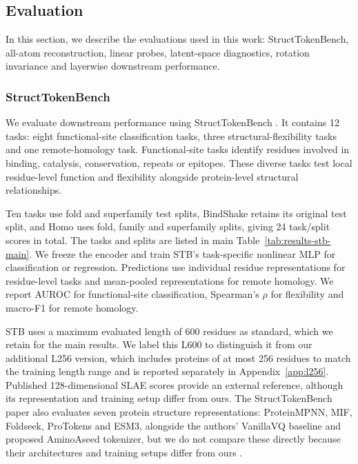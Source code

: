 \subsection{Evaluation}
\label{sec:methods-evaluation}

In this section, we describe the evaluations used in this work: StructTokenBench, all-atom reconstruction, linear probes, latent-space diagnostics, rotation invariance and layerwise downstream performance.


\subsubsection{StructTokenBench}

We evaluate downstream performance using StructTokenBench \citep{yuan2025protein}. It contains 12 tasks: eight functional-site classification tasks, three structural-flexibility tasks and one remote-homology task. Functional-site tasks identify residues involved in binding, catalysis, conservation, repeats or epitopes. These diverse tasks test local residue-level function and flexibility alongside protein-level structural relationships.

Ten tasks use fold and superfamily test splits, BindShake retains its original test split, and Homo uses fold, family and superfamily splits, giving 24 task/split scores in total. The tasks and splits are listed in main Table~\ref{tab:results-stb-main}. We freeze the encoder and train STB's task-specific nonlinear MLP for classification or regression. Predictions use individual residue representations for residue-level tasks and mean-pooled representations for remote homology. We report AUROC for functional-site classification, Spearman's $\rho$ for flexibility and macro-F1 for remote homology.

STB uses a maximum evaluated length of 600 residues as standard, which we retain for the main results. We label this L600 to distinguish it from our additional L256 version, which includes proteins of at most 256 residues to match the training length range and is reported separately in Appendix~\ref{app:l256}. Published 128-dimensional SLAE scores provide an external reference, although its representation and training setup differ from ours. The StructTokenBench paper also evaluates seven protein structure representations: ProteinMPNN, MIF, Foldseek, ProTokens and ESM3, alongside the authors' VanillaVQ baseline and proposed AminoAseed tokenizer, but we do not compare these directly because their architectures and training setups differ from ours \citep{yuan2025protein}.


